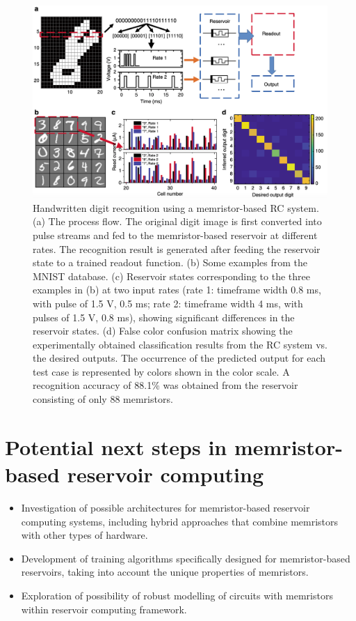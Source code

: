 \documentclass[11pt, oneside]{article}
\begin{document}
\begin{figure}[H]
    \centering
    \includegraphics[width=\textwidth]{figs/reservoir-memristor-4.png}

    \caption{Handwritten digit recognition using a memristor-based RC system. (a) The process flow. The original digit image is first converted into pulse streams and fed to the memristor-based reservoir at different rates. The recognition result is generated after feeding the reservoir state to a trained readout function. (b) Some examples from the MNIST database. (c) Reservoir states corresponding to the three examples in (b) at two input rates (rate 1: timeframe width 0.8 ms, with pulse of 1.5 V, 0.5 ms; rate 2: timeframe width 4 ms, with pulses of 1.5 V, 0.8 ms), showing significant differences in the reservoir states. (d) False color confusion matrix showing the experimentally obtained classification results from the RC system vs. the desired outputs. The occurrence of the predicted output for each test case is represented by colors shown in the color scale. A recognition accuracy of 88.1\% was obtained from the reservoir consisting of only 88 memristors.}
\end{figure}
\section{Potential next steps in memristor-based reservoir computing}

\begin{itemize}
    \item Investigation of possible architectures for memristor-based reservoir computing systems, including hybrid approaches that combine memristors with other types of hardware.
    \item Development of training algorithms specifically designed for memristor-based reservoirs, taking into account the unique properties of memristors.
    \item Exploration of possibility of robust modelling of circuits with memristors within reservoir computing framework.
\end{itemize}

\printbibliography
\end{document}
